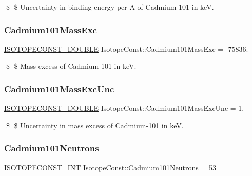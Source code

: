 \$ \$ Uncertainty in binding energy per A of Cadmium-\/101 in keV. \mbox{\label{group___isotope_const-_cadmium-_cd101_ga254ab75c4d303fae86b39a7a3cb23f30}} 
\subsubsection{\texorpdfstring{Cadmium101\+Mass\+Exc}{Cadmium101MassExc}}
{\footnotesize\ttfamily \mbox{\hyperlink{group___isotope_const-_macros_ga8f45a7272ce02c0b4c65c44636ed719a}{I\+S\+O\+T\+O\+P\+E\+C\+O\+N\+S\+T\+\_\+\+D\+O\+U\+B\+LE}} Isotope\+Const\+::\+Cadmium101\+Mass\+Exc = -\/75836.}

\$ \$ Mass excess of Cadmium-\/101 in keV. \mbox{\label{group___isotope_const-_cadmium-_cd101_ga9106a425245761f3ba8e58b3391a7364}} 
\subsubsection{\texorpdfstring{Cadmium101\+Mass\+Exc\+Unc}{Cadmium101MassExcUnc}}
{\footnotesize\ttfamily \mbox{\hyperlink{group___isotope_const-_macros_ga8f45a7272ce02c0b4c65c44636ed719a}{I\+S\+O\+T\+O\+P\+E\+C\+O\+N\+S\+T\+\_\+\+D\+O\+U\+B\+LE}} Isotope\+Const\+::\+Cadmium101\+Mass\+Exc\+Unc = 1.}

\$ \$ Uncertainty in mass excess of Cadmium-\/101 in keV. \mbox{\label{group___isotope_const-_cadmium-_cd101_ga0e2be012f824f41121792438157c7887}} 
\subsubsection{\texorpdfstring{Cadmium101\+Neutrons}{Cadmium101Neutrons}}
{\footnotesize\ttfamily \mbox{\hyperlink{group___isotope_const-_macros_ga5f18360b3e99483a35c32d789e62621c}{I\+S\+O\+T\+O\+P\+E\+C\+O\+N\+S\+T\+\_\+\+I\+NT}} Isotope\+Const\+::\+Cadmium101\+Neutrons = 53}

